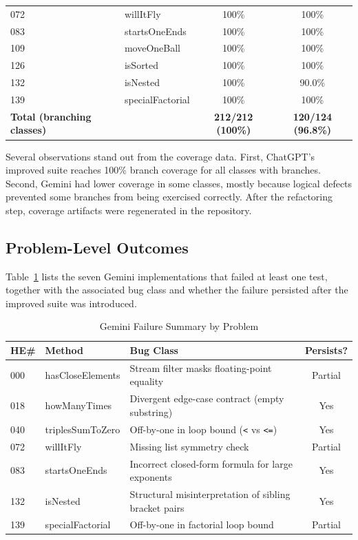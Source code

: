 \documentclass[journal]{IEEEtran}
\begin{document}
\begin{table}[h]
{\begin{tabular}{llcc}
072 & willItFly          & 100\% & 100\% \\
083 & startsOneEnds      & 100\% & 100\% \\
109 & moveOneBall        & 100\% & 100\% \\
126 & isSorted           & 100\% & 100\% \\
132 & isNested           & 100\% & 90.0\% \\
139 & specialFactorial   & 100\% & 100\% \\
\midrule
\textbf{Total (branching classes)} &
  & \textbf{212/212 (100\%)} & \textbf{120/124 (96.8\%)} \\
\bottomrule
\end{tabular}}
\end{table}

Several observations stand out from the coverage data. First, ChatGPT's improved suite reaches 100\% branch coverage for all classes with branches. Second, Gemini had lower coverage in some classes, mostly because logical defects prevented some branches from being exercised correctly. After the refactoring step, coverage artifacts were regenerated in the repository.

\subsection{Problem-Level Outcomes}
Table~\ref{tab:gemini-failures} lists the seven Gemini implementations that
failed at least one test, together with the associated bug class and whether
the failure persisted after the improved suite was introduced.

\begin{table}[h]
\centering
\caption{Gemini Failure Summary by Problem}
\label{tab:gemini-failures}
\begin{tabular}{llp{3.8cm}c}
\toprule
HE\# & Method & Bug Class & Persists? \\
\midrule
000 & hasCloseElements  & Stream filter masks floating-point equality        & Partial \\
018 & howManyTimes      & Divergent edge-case contract (empty substring)     & Yes \\
040 & triplesSumToZero  & Off-by-one in loop bound (\texttt{<} vs \texttt{<=}) & Yes \\
072 & willItFly         & Missing list symmetry check & Partial \\
083 & startsOneEnds     & Incorrect closed-form formula for large exponents  & Yes \\
132 & isNested          & Structural misinterpretation of sibling bracket pairs & Yes \\
139 & specialFactorial  & Off-by-one in factorial loop bound                 & Partial \\
\bottomrule
\end{tabular}
\end{table}
\end{document}
